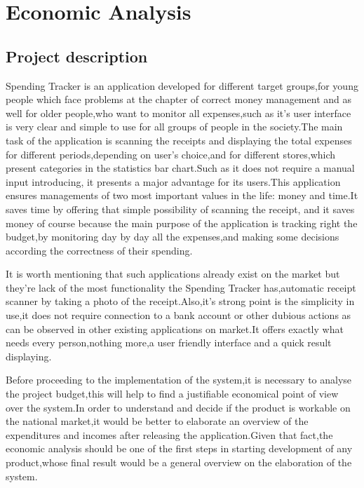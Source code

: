 \section{Economic Analysis}
\subsection{Project description}
Spending Tracker is an application developed for different target groups,for young people which face problems at the chapter of correct money management and as well for older people,who want to monitor all expenses,such as it's user interface is very clear and simple to use for all groups of people in the society.The main task of the application is scanning the receipts and displaying the total expenses for different periods,depending on user's choice,and for different stores,which present categories in the statistics bar chart.Such as it does not require a manual input introducing, it presents a major advantage for its users.This application ensures managements of two most important values in the life: money and time.It saves time by offering that simple possibility of scanning the receipt, and it saves money of course because the main purpose of the application is tracking right the budget,by monitoring day by day all the expenses,and making some decisions according the correctness of their spending.

It is worth mentioning that such applications already exist on the market but they're lack of the most functionality the Spending Tracker has,automatic receipt scanner by taking a photo of the receipt.Also,it's strong point is the simplicity in use,it does not require connection to a bank account or other dubious actions as can be observed in other existing applications on market.It offers exactly what needs every person,nothing more,a user friendly interface and a quick result displaying.

Before proceeding to the implementation of the system,it is necessary to analyse the project budget,this will help to find a justifiable economical point of view over the system.In order to understand and decide if the product is workable on the national market,it would be better to elaborate an overview of the expenditures and incomes after releasing the application.Given that fact,the economic analysis should be one of the first steps in starting development of any product,whose final result would be a general overview on the elaboration of the system.

